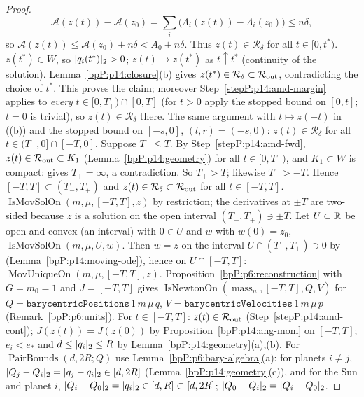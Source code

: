 \begin{proof}
\begin{equation}\label{bpP:p14:eq:amd-id}
\mathcal A(z(t))-\mathcal A(z_0)=\sum_i\bigl(\Lambda_i(z(t))-\Lambda_i(z_0)\bigr)\le n\delta,
\end{equation}
so $\mathcal A(z(t))\le\mathcal A(z_0)+n\delta<A_0+n\delta$. Thus $z(t)\in\mathcal R_\delta$ for all $t\in[0,t^*)$.
\label{stepP:p14:amd-close} $z(t^*)\in W$, so $\lvert q_i(t^*)\rvert_2>0$; $z(t)\to z(t^*)$ as $t\uparrow t^*$ (continuity of the solution). Lemma~\ref{bpP:p14:closure}(b) gives $z(t^*)\in\mathcal R_\delta\subset\mathcal R_{\rm out}$, contradicting the choice of $t^*$. This proves the claim; moreover Step~\ref{stepP:p14:amd-margin} applies to \emph{every} $t\in[0,T_+)\cap[0,T]$ (for $t>0$ apply the stopped bound on $[0,t]$; $t=0$ is trivial), so $z(t)\in\mathcal R_\delta$ there.
\label{stepP:p14:amd-bwd} The same argument with $t\mapsto z(-t)$ in  ((b)) and the stopped bound on $[-s,0]$, $(l,r)=(-s,0)$: $z(t)\in\mathcal R_\delta$ for all $t\in(T_-,0]\cap[-T,0]$.
\label{stepP:p14:amd-cont} Suppose $T_+\le T$. By Step~\ref{stepP:p14:amd-fwd}, $z(t)\in\mathcal R_{\rm out}\subset K_1$ (Lemma~\ref{bpP:p14:geometry}) for all $t\in[0,T_+)$, and $K_1\subset W$ is compact:  gives $T_+=\infty$, a contradiction. So $T_+>T$; likewise $T_->-T$. Hence $[-T,T]\subset(T_-,T_+)$ and $z(t)\in\mathcal R_\delta\subset\mathcal R_{\rm out}$ for all $t\in[-T,T]$.
\label{stepP:p14:amd-a} $\operatorname{IsMovSolOn}(m,\mu,[-T,T],z)$ by restriction; the derivatives at $\pm T$ are two-sided because $z$ is a solution on the open interval $(T_-,T_+)\ni\pm T$. Let $U\subset\mathbb{R}$ be open and convex (an interval) with $0\in U$ and $w$ with $w(0)=z_0$, $\operatorname{IsMovSolOn}(m,\mu,U,w)$. Then $w=z$ on the interval $U\cap(T_-,T_+)\ni0$ by  (Lemma~\ref{bpP:p14:moving-ode}), hence on $U\cap[-T,T]$: $\operatorname{MovUniqueOn}(m,\mu,[-T,T],z)$.
\label{stepP:p14:amd-b} Proposition~\ref{bpP:p6:reconstruction} with $G=m_0=1$ and $J=[-T,T]$ gives $\operatorname{IsNewtonOn}(\operatorname{mass}_\mu,[-T,T],Q,V)$ for $Q=\texttt{barycentricPositions}\,1\,m\,\mu\,q$, $V=\texttt{barycentricVelocities}\,1\,m\,\mu\,p$ (Remark~\ref{bpP:p6:units}).
\label{stepP:p14:amd-c} For $t\in[-T,T]$: $z(t)\in\mathcal R_{\rm out}$ (Step~\ref{stepP:p14:amd-cont}); $J(z(t))=J(z(0))$ by Proposition~\ref{bpP:p14:ang-mom} on $[-T,T]$; $e_i<e_*$ and $d\le\lvert q_i\rvert_2\le R$ by Lemma~\ref{bpP:p14:geometry}(a),(b). For $\operatorname{PairBounds}(d,2R;Q)$ use Lemma~\ref{bpP:p6:bary-algebra}(a): for planets $i\ne j$, $\lvert Q_j-Q_i\rvert_2=\lvert q_j-q_i\rvert_2\in[d,2R]$ (Lemma~\ref{bpP:p14:geometry}(c)), and for the Sun and planet $i$, $\lvert Q_i-Q_0\rvert_2=\lvert q_i\rvert_2\in[d,R]\subset[d,2R]$; $\lvert Q_0-Q_i\rvert_2=\lvert Q_i-Q_0\rvert_2$.

\end{proof}

